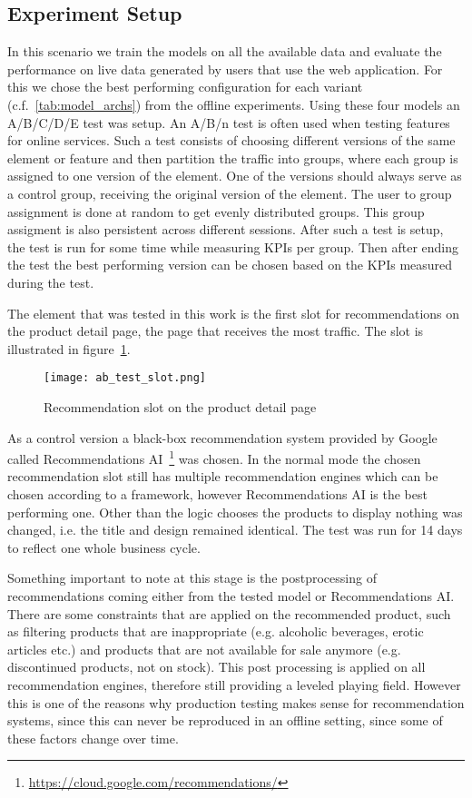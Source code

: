 \subsection{Experiment Setup}
In this scenario we train the models on all the available data and evaluate the performance on live data generated by users that use the web application.
For this we chose the best performing configuration for each variant (c.f.~\ref{tab:model_archs}) from the offline experiments.
Using these four models an A/B/C/D/E test was setup.
An A/B/n test is often used when testing features for online services.
Such a test consists of choosing different versions of the same element or feature and then partition the traffic into groups, where each group is assigned to one version of the element.
One of the versions should always serve as a control group, receiving the original version of the element.
The user to group assignment is done at random to get evenly distributed groups.
This group assigment is also persistent across different sessions.
After such a test is setup, the test is run for some time while measuring KPIs per group.
Then after ending the test the best performing version can be chosen based on the KPIs measured during the test.
\par
The element that was tested in this work is the first slot for recommendations on the product detail page, the page that receives the most traffic.
The slot is illustrated in figure~\ref{fig:ab_test_slot}.
\begin{figure}[t]
	\centering
	\captionsetup{width=0.8\textwidth}
    \texttt{[image: ab\_test\_slot.png]}
    \caption{Recommendation slot on the product detail page}
    \label{fig:ab_test_slot}
\end{figure}
As a control version a black-box recommendation system provided by Google called Recommendations AI~\footnote{\url{https://cloud.google.com/recommendations/}} was chosen.
In the normal mode the chosen recommendation slot still has multiple recommendation engines which can be chosen according to a framework, however Recommendations AI is the best performing one.
Other than the logic chooses the products to display nothing was changed, i.e. the title and design remained identical.
The test was run for 14 days to reflect one whole business cycle.
\par
Something important to note at this stage is the postprocessing of recommendations coming either from the tested model or Recommendations AI.
There are some constraints that are applied on the recommended product, such as filtering products that are inappropriate (e.g. alcoholic beverages, erotic articles etc.) and products that are not available for sale anymore (e.g. discontinued products, not on stock).
This post processing is applied on all recommendation engines, therefore still providing a leveled playing field.
However this is one of the reasons why production testing makes sense for recommendation systems, since this can never be reproduced in an offline setting, since some of these factors change over time.
